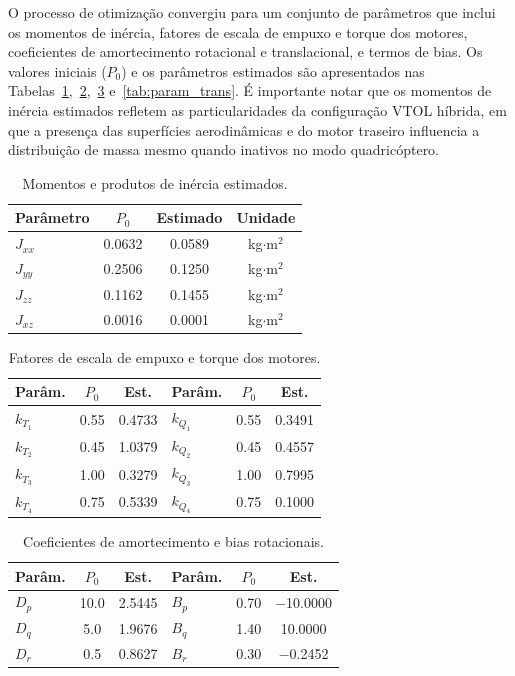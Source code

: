 \documentclass[letterpaper, 10 pt, conference]{ieeeconf}
\begin{document}
O processo de otimização convergiu para um conjunto de parâmetros que inclui os momentos de inércia, fatores de escala de empuxo e torque dos motores, coeficientes de amortecimento rotacional e translacional, e termos de bias. Os valores iniciais ($P_0$) e os parâmetros estimados são apresentados nas Tabelas~\ref{tab:param_inercia},~\ref{tab:param_motor},~\ref{tab:param_rot} e~\ref{tab:param_trans}. É importante notar que os momentos de inércia estimados refletem as particularidades da configuração VTOL híbrida, em que a presença das superfícies aerodinâmicas e do motor traseiro influencia a distribuição de massa mesmo quando inativos no modo quadricóptero.

\begin{table}[htbp]
\centering
\begin{tabular}{l|c|c|c}
\hline
\textbf{Par\^ametro} & \textbf{$P_0$} & \textbf{Estimado} & \textbf{Unidade} \\
\hline
$J_{xx}$ & 0.0632 & 0.0589 & kg$\cdot$m$^2$ \\
$J_{yy}$ & 0.2506 & 0.1250 & kg$\cdot$m$^2$ \\
$J_{zz}$ & 0.1162 & 0.1455 & kg$\cdot$m$^2$ \\
$J_{xz}$ & 0.0016 & 0.0001 & kg$\cdot$m$^2$ \\
\hline
\end{tabular}
\caption{Momentos e produtos de in\'ercia estimados.}
\label{tab:param_inercia}
\end{table}

\begin{table}[htbp]
\centering
\begin{tabular}{l|c|c||l|c|c}
\hline
\textbf{Par\^am.} & \textbf{$P_0$} & \textbf{Est.} & \textbf{Par\^am.} & \textbf{$P_0$} & \textbf{Est.} \\
\hline
$k_{T_1}$ & 0.55 & 0.4733 & $k_{Q_1}$ & 0.55 & 0.3491 \\
$k_{T_2}$ & 0.45 & 1.0379 & $k_{Q_2}$ & 0.45 & 0.4557 \\
$k_{T_3}$ & 1.00 & 0.3279 & $k_{Q_3}$ & 1.00 & 0.7995 \\
$k_{T_4}$ & 0.75 & 0.5339 & $k_{Q_4}$ & 0.75 & 0.1000 \\
\hline
\end{tabular}
\caption{Fatores de escala de empuxo e torque dos motores.}
\label{tab:param_motor}
\end{table}

\begin{table}[htbp]
\centering
\begin{tabular}{l|c|c||l|c|c}
\hline
\textbf{Par\^am.} & \textbf{$P_0$} & \textbf{Est.} & \textbf{Par\^am.} & \textbf{$P_0$} & \textbf{Est.} \\
\hline
$D_p$ & 10.0 & 2.5445 & $B_p$ & 0.70 & $-$10.0000 \\
$D_q$ & 5.0 & 1.9676 & $B_q$ & 1.40 & 10.0000 \\
$D_r$ & 0.5 & 0.8627 & $B_r$ & 0.30 & $-$0.2452 \\
\hline
\end{tabular}
\caption{Coeficientes de amortecimento e bias rotacionais.}
\label{tab:param_rot}
\end{table}
\end{document}
